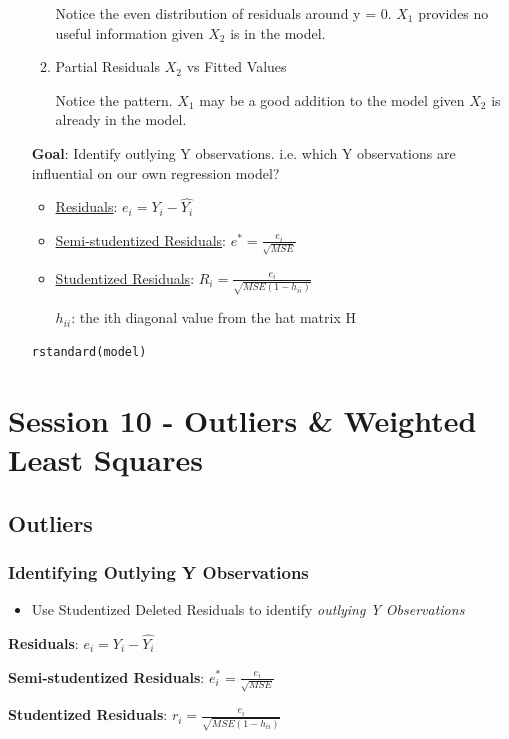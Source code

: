 \documentclass[11pt]{article}
\begin{document}
\begin{enumerate}
\begin{enumerate}
Notice the even distribution of residuals around y = 0. \(X_1\) provides no
useful information given \(X_2\) is in the model.

\item Partial Residuals \(X_2\) vs Fitted Values

Notice the pattern. \(X_1\) may be a good addition to the model given \(X_2\) is
already in the model.
\end{enumerate}

\textbf{Goal}: Identify outlying Y observations. i.e. which Y observations are
 influential on our own regression model?

\begin{itemize}
\item \uline{Residuals}: \(e_i = Y_i - \hat{Y_i}\)
\item \uline{Semi-studentized Residuals}: \(e^* = \frac{e_i}{\sqrt{MSE}}\)
\item \uline{Studentized Residuals}: \(R_i = \frac{e_i}{\sqrt{MSE(1 - h_{ii})}}\)

\(h_{ii}\): the ith diagonal value from the hat matrix H
\end{itemize}

\begin{verbatim}
rstandard(model)
\end{verbatim}
\end{enumerate}
\section{Session 10 - Outliers \& Weighted Least Squares}
\label{sec:org064afb4}
\subsection{Outliers}
\label{sec:org90963a5}
\subsubsection{Identifying Outlying Y Observations}
\label{sec:org5815a0a}
\begin{itemize}
\item Use Studentized Deleted Residuals to identify \emph{outlying Y Observations}
\end{itemize}

\textbf{Residuals}: \(e_i = Y_i - \hat{Y_i}\)

\textbf{Semi-studentized Residuals}: \(e_i^* = \frac{e_i}{\sqrt{MSE}}\)

\textbf{Studentized Residuals}: \(r_i =\frac{e_i}{\sqrt{MSE(1 - h_{ii})}}\)
\end{document}
